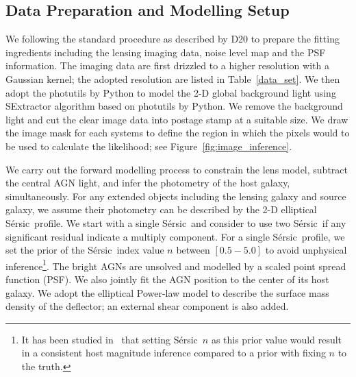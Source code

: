 \documentclass[fleqn,usenatbib]{mnras}
\newcommand{\sersic}{S\'ersic}
\begin{document}
\subsection{Data Preparation and Modelling Setup}
We following the standard procedure as described by D20 to prepare the fitting ingredients including the lensing imaging data, noise level map and the PSF information. The imaging data are first drizzled to a higher resolution with a Gaussian kernel; the adopted resolution are listed in Table~\ref{data_set}. We then adopt the {\sc photutils} by Python to model the 2-D global background light using SExtractor algorithm based on {\sc photutils} by Python. We remove the background light and cut the clear image data into postage stamp at a suitable size. We draw the image mask for each systems to define the region in which the pixels would to be used to calculate the likelihood; see Figure~\ref{fig:image_inference}.

We carry out the forward modelling process to constrain the lens model, subtract the central AGN light, and infer the photometry of the host galaxy, simultaneously. For any extended objects including the lensing galaxy and source galaxy, we assume their photometry can be described by the 2-D elliptical \sersic\ profile. We start with a single \sersic\ and consider to use two \sersic\ if any significant residual indicate a multiply component. For a single \sersic\ profile, we set the prior of the \sersic\ index value $n$ between $[0.5-5.0]$ to avoid unphysical inference\footnote{It has been studied in~\citet{Ding2017a} that setting \sersic\ $n$ as this prior value would result in a consistent host magnitude inference compared to a prior with fixing $n$ to the truth.}. The bright AGNs are unsolved and modelled by a scaled point spread function (PSF). We also jointly fit the AGN position to the center of its host galaxy. We adopt the elliptical Power-law model to describe the surface mass density of the deflector; an external shear component is also added.
\end{document}

